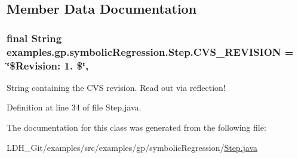 \subsection{Member Data Documentation}
\hypertarget{classexamples_1_1gp_1_1symbolic_regression_1_1_step_ad7ba20d56408811914c460566b21ed76}{
\subsubsection[{C\-V\-S\-\_\-\-R\-E\-V\-I\-S\-I\-O\-N}]{\setlength{\rightskip}{0pt plus 5cm}final String examples.\-gp.\-symbolic\-Regression.\-Step.\-C\-V\-S\-\_\-\-R\-E\-V\-I\-S\-I\-O\-N = \char`\"{}\$Revision\-: 1. \$\char`\"{}\hspace{0.3cm}{\ttfamily [static]}, {\ttfamily [private]}}}\label{classexamples_1_1gp_1_1symbolic_regression_1_1_step_ad7ba20d56408811914c460566b21ed76}
String containing the C\-V\-S revision. Read out via reflection! 

Definition at line 34 of file Step.\-java.



The documentation for this class was generated from the following file\-:\begin{DoxyCompactItemize}
\item 
L\-D\-H\-\_\-\-Git/examples/src/examples/gp/symbolic\-Regression/\hyperlink{_step_8java}{Step.\-java}\end{DoxyCompactItemize}
